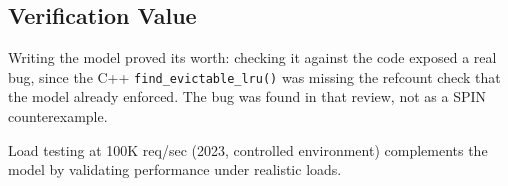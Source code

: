 \documentclass[11pt,a4paper]{article}
\begin{document}
\subsection{Verification Value}

Writing the model proved its worth: checking it against the code exposed a
real bug, since the C++ \texttt{find\_evictable\_lru()} was missing the
refcount check that the model already enforced. The bug was found in that
review, not as a SPIN counterexample.

Load testing at 100K req/sec (2023, controlled environment) complements the
model by validating performance under realistic loads.
\end{document}
